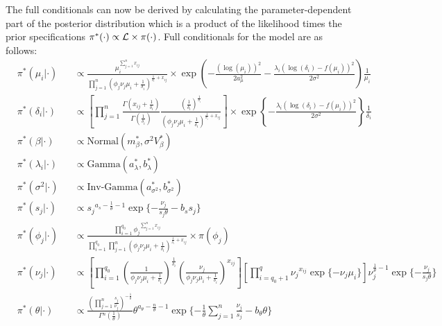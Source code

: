 \newpage

The full conditionals can now be derived by calculating the parameter-dependent part of the posterior distribution which is a product of the likelihood times the prior specifications $\pi^\ast(\cdot)\propto{}\mathcal{L}\times\pi(\cdot)$. Full conditionals for the model are as follows: \\

\begingroup
\addtolength{\jot}{0.8em}
\begin{align*} \label{eq::FullCond}
&\pi^*(\mu_i|\cdot) && \propto \frac{\mu_i^{\sum_{j=1}^n{}x_{ij}}}{\prod_{j=1}^n{}(\phi_j\nu_j\mu_i+\frac{1}{\delta_i})^{\frac{1}{\delta_i}+x_{ij}}}\times{}\exp\left(-\frac{(\log(\mu_i))^2}{2a_\mu^2}-\frac{\lambda_i(\log(\delta_i)-f(\mu_i))^2}{2\sigma^2}\right)\frac{1}{\mu_i} \\
&\pi^*(\delta_i|\cdot) && \propto \left[\prod_{j=1}^n\frac{\Gamma(x_{ij}+\frac{1}{\delta_i})}{\Gamma(\frac{1}{\delta_i})}\frac{(\frac{1}{\delta_i})^{\frac{1}{\delta_i}}}{(\phi_j\nu_j\mu_i+\frac{1}{\delta_i})^{\frac{1}{\delta_i}+x_{ij}}}\right]\times{}\exp\left\lbrace-\frac{\lambda_i(\log(\delta_i)-f(\mu_i))^2}{2\sigma^2}\right\rbrace\frac{1}{\delta_i}\\
&\pi^*(\beta|\cdot)&&\propto{}\text{Normal}(m^*_\beta,\sigma^2V^*_\beta)\\
&\pi^*(\lambda_i|\cdot)&&\propto{}\text{Gamma}(a^*_\lambda,b^*_\lambda)\\
&\pi^*(\sigma^2|\cdot)&&\propto{}\text{Inv-Gamma}(a^*_{\sigma^2},b^*_{\sigma^2})\\
&\pi^*(s_j|\cdot)&&\propto{}s_j{}^{a_s-\frac{1}{\theta}-1}\exp\lbrace-\frac{\nu_j}{s_j\theta}-b_ss_j\rbrace\\
&\pi^*(\phi_j|\cdot)&&\propto{}\frac{\prod_{i=1}^{q_0}\phi_j{}^{\sum_{j=1}^nx_{ij}}}{\prod_{i=1}^{q_0}\prod_{j=1}^{n}(\phi_j\nu_j\mu_i+\frac{1}{\delta_i})^{\frac{1}{\delta_i}+x_{ij}}}\times{}\pi(\phi_j)\\
&\pi^*(\nu_j|\cdot)&&\propto{}\left[\prod_{i=1}^{q_0}\left(\frac{1}{\phi_j\nu_j\mu_i+\frac{1}{\delta_i}}\right)^\frac{1}{\delta_i}\left(\frac{\nu_j}{\phi_j\nu_j\mu_i+\frac{1}{\delta_i}}\right)^{x_{ij}}\right]\left[\prod_{i=q_0+1}^{q}\nu_j{}^{x_{ij}}\exp\lbrace-\nu_j\mu_i\rbrace\right]\nu_j^{\frac{1}{\theta}-1}\exp\lbrace-\frac{\nu_j}{s_j\theta}\rbrace\\
&\pi^*(\theta|\cdot)&&\propto{}\frac{\left(\prod_{j=1}^{n}\frac{s_j}{\nu_j}\right)^{-\frac{1}{\theta}}}{\Gamma{}^n(\frac{1}{\theta})}\theta^{a_\theta-\frac{n}{\theta}-1}\exp\lbrace-\frac{1}{\theta}\sum_{j=1}^n\frac{\nu_j}{s_j}-b_\theta\theta\rbrace
\end{align*}
\endgroup

